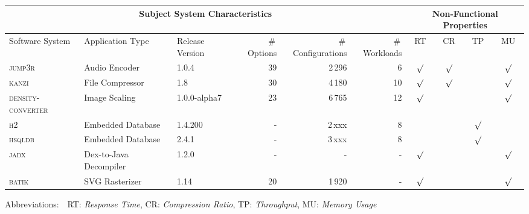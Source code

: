 \begin{tabular}{lllrrr|cccc}
		\toprule
		\multicolumn{6}{c}{\textbf{Subject System Characteristics}} & \multicolumn{4}{c}{\textbf{Non-Functional Properties}} \\
		\midrule
		Software System &  Application Type & Release Version & \#\,Options & \#\,Configurations & \#\,Workloads & RT & CR & TP & MU \\
		\midrule
		\rowcolor{black!15}
		\textsc{jump3r} & Audio Encoder & 1.0.4 & 39 & {\color{Brown}2\,296} & 6 & $\surd$ & $\surd$ &  & $\surd$  \\
		
		\rowcolor{black!15}	
		\textsc{kanzi} & File Compressor & 1.8 & 30 & {\color{Brown}4\,180} & 10 & $\surd$ & $\surd$ &  & $\surd$  \\
		
		\rowcolor{black!15}	
		\textsc{density-converter} & Image Scaling & 1.0.0-alpha7 & 23 & 6\,765 & 12 & $\surd$  &  &  & $\surd$  \\
				
		\rowcolor{black!15}	
		\textsc{h2} & Embedded Database & 1.4.200 & - & 2\,xxx  & 8 &   &  & $\surd$ &  \\
		

		\rowcolor{black!15}	
		\textsc{hsqldb} & Embedded Database & 2.4.1 & - & 3\,xxx & 8  &  &  & $\surd$ &  \\
		

		\rowcolor{SpringGreen!20}
		\textsc{jadx} & Dex-to-Java Decompiler & 1.2.0 & - & - & - & $\surd$ &  &  & $\surd$  \\
		
		\rowcolor{SpringGreen!20}
		\textsc{batik} & SVG Rasterizer & 1.14 & 20 & {\color{Brown}1\,920} &  - & $\surd$ &   &  & $\surd$  \\
		
		
		
		
		\bottomrule
	\end{tabular}
	
	{\vspace{2mm}
	{Abbreviations:$\quad$RT: \textit{Response Time}, CR: \textit{Compression Ratio}, TP: \textit{Throughput}, MU: \textit{Memory Usage}}}
	\vspace{0.1cm}
